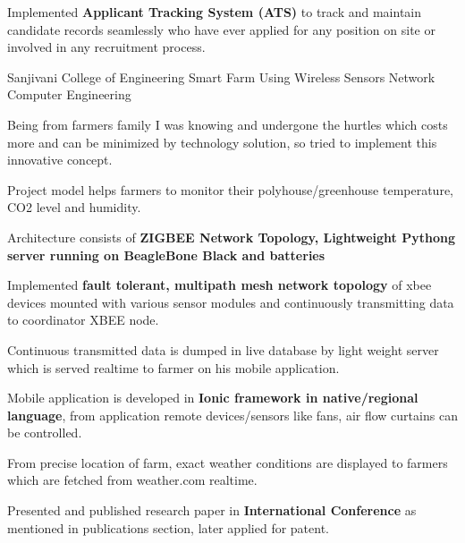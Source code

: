 \begin{cventries}
{\begin{cvitems}
        \item {Implemented \textbf{Applicant Tracking System (ATS)} to track and maintain candidate records  seamlessly who have ever applied for any position on site or involved in any recruitment process.}
        \\
      \end{cvitems}
    }
    \cventry
    {Sanjivani College of Engineering} %
    {Smart Farm Using Wireless Sensors Network} %
    {Computer Engineering} %
    { } %
    {
      \begin{cvitems} %
        \item {Being from farmers family I was knowing and undergone the hurtles which costs more and can be minimized by technology solution, so tried to implement this innovative concept.}
        \item {Project model helps farmers to monitor their polyhouse/greenhouse temperature, CO2 level and humidity.}
        \item {Architecture consists of \textbf{ZIGBEE Network Topology, Lightweight Pythong server running on BeagleBone Black and batteries}}
        \item {Implemented \textbf{fault tolerant, multipath mesh network topology} of xbee devices mounted with various sensor modules and continuously transmitting data to coordinator XBEE node.}
        \item {Continuous transmitted data is dumped in live database by light weight server which is served realtime to farmer on his mobile application. }
        \item{Mobile application is developed in \textbf{Ionic framework in native/regional language}, from application remote devices/sensors like fans, air flow curtains can be controlled.}
        \item {From precise location of farm, exact weather conditions are displayed to farmers which are fetched from weather.com realtime.}
        \item {Presented and published research paper in \textbf{International Conference} as mentioned in publications section, later applied for patent.}
      \end{cvitems}
    }
\end{cventries}

